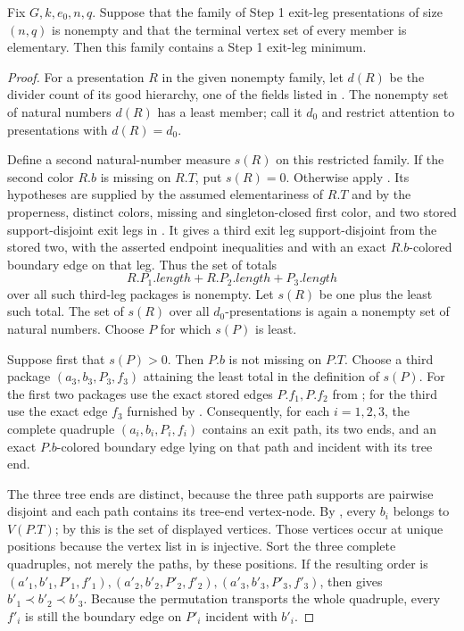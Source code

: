 \begin{lemma}
Fix $G,k,e_0,n,q$.  Suppose that the family of Step 1 exit-leg
presentations of size $(n,q)$ is nonempty and that the terminal vertex
set of every member is elementary.  Then this family contains a Step 1
exit-leg minimum.
\end{lemma}
\begin{proof}
For a presentation $R$ in the given nonempty family, let $d(R)$ be the
divider count of its good hierarchy, one of the fields listed in
.  The nonempty set of natural numbers
$d(R)$ has a least member; call it $d_0$ and restrict attention to
presentations with $d(R)=d_0$.

Define a second natural-number measure $s(R)$ on this restricted family.
If the second color $R.b$ is missing on $R.T$, put $s(R)=0$.  Otherwise
apply .  Its hypotheses
are supplied by the assumed elementariness of $R.T$ and by the
properness, distinct colors, missing and singleton-closed first color,
and two stored support-disjoint exit legs in
.  It gives a third exit leg
support-disjoint from the stored two, with the asserted endpoint
inequalities and with an exact $R.b$-colored boundary edge on that leg.
Thus the set of totals
\[
 R.P_1.\mathit{length}+R.P_2.\mathit{length}+P_3.\mathit{length}
\]
over all such third-leg packages is nonempty.  Let $s(R)$ be one plus
the least such total.  The set of $s(R)$ over all $d_0$-presentations is
again a nonempty set of natural numbers.  Choose $P$ for which $s(P)$ is
least.

Suppose first that $s(P)>0$.  Then $P.b$ is not missing on $P.T$.
Choose a third package $(a_3,b_3,P_3,f_3)$ attaining the least total in
the definition of $s(P)$.  For the first two packages use the exact
stored edges $P.f_1,P.f_2$ from
; for the third use the exact edge
$f_3$ furnished by .
Consequently, for each $i=1,2,3$, the complete quadruple
$(a_i,b_i,P_i,f_i)$ contains an exit path, its two ends, and an exact
$P.b$-colored boundary edge lying on that path and incident with its
tree end.

The three tree ends are distinct, because the three path supports are
pairwise disjoint and each path contains its tree-end vertex-node.
By , every $b_i$ belongs to $V(P.T)$; by
 this is the set of displayed vertices.
Those vertices occur at unique positions because the vertex list in
 is injective.  Sort the three complete quadruples,
not merely the paths, by these positions.  If the resulting order is
$(a'_1,b'_1,P'_1,f'_1),(a'_2,b'_2,P'_2,f'_2),
(a'_3,b'_3,P'_3,f'_3)$, then
 gives $b'_1\prec b'_2\prec b'_3$.
Because the permutation transports the whole quadruple, every $f'_i$
is still the boundary edge on $P'_i$ incident with $b'_i$.


\end{proof}
